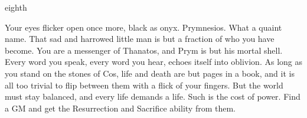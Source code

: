 \documentclass[greennotebook]{Kos}
\begin{document}
\begin{page}{eighth}

Your eyes flicker open once more, black as onyx. Prymnesios. What a quaint name. That sad and harrowed little man is but a fraction of who you have become. You are a messenger of Thanatos, and Prym is but his mortal shell. Every word you speak, every word you hear, echoes itself into oblivion. As long as you stand on the stones of Cos, life and death are but pages in a book, and it is all too trivial to flip between them with a flick of your fingers. But the world must stay balanced, and every life demands a life. Such is the cost of power. Find a GM and get the Resurrection and Sacrifice ability from them. 

\end{page}

\endnotebook
\end{document}

